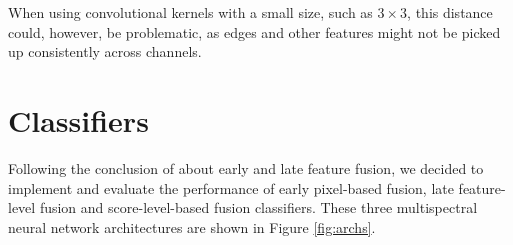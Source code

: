\documentclass{l4proj}
\begin{document}
When using convolutional kernels with a small size, such as $3 \times 3$, this distance could, however, be problematic, as edges and other features might not be picked up consistently across channels.


\section{Classifiers}
\label{design_classifiers}

Following the conclusion of \citet{wagner_multispectral_2016} about early and late feature fusion, we decided to implement and evaluate the performance of early pixel-based fusion, late feature-level fusion and score-level-based fusion classifiers. These three multispectral neural network architectures are shown in Figure \ref{fig:archs}.
\end{document}
